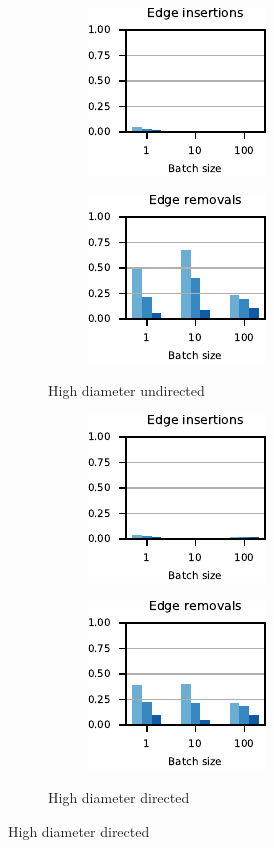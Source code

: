 \begin{figure}[tb]
\begin{subfigure}[t]{.5\textwidth}
\begin{subfigure}[t]{.5\textwidth}
\centering
\includegraphics{./sources/plots/dyn-topk/breakdown-undirected-high-diameter-addition.pdf}
\end{subfigure}\hfill
\begin{subfigure}[t]{.5\textwidth}
\centering
\includegraphics{./sources/plots/dyn-topk/breakdown-undirected-high-diameter-removal.pdf}
\end{subfigure}\hfill
\caption{High diameter undirected}
\label{fig:dyn-topk-breakdown-road-undir}
\end{subfigure}\hfill
%
%
\begin{subfigure}[t]{.5\textwidth}
\begin{subfigure}[t]{.5\textwidth}
\centering
\includegraphics{./sources/plots/dyn-topk/breakdown-directed-high-diameter-addition.pdf}
\end{subfigure}\hfill
\begin{subfigure}[t]{.5\textwidth}
\centering
\includegraphics{./sources/plots/dyn-topk/breakdown-directed-high-diameter-removal.pdf}
\end{subfigure}\hfill
\caption{High diameter directed}
\label{fig:dyn-topk-breakdown-road-dir}
\end{subfigure}


\end{figure}
